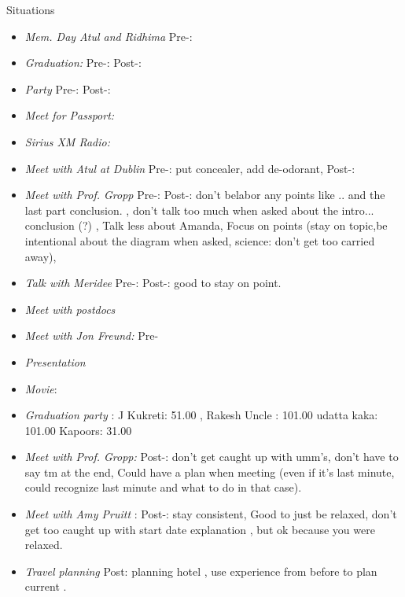 \documentclass[serif, mathserif, final]{beamer}
\begin{document}
\begin{frame}{}
\begin{columns}
\begin{column}{0.20\linewidth}
\begin{block}{Situations}
\begin{itemize}
        \item \tiny \textit{Mem. Day Atul and Ridhima} Pre-: 
        \item \tiny \textit{Graduation:} Pre-:   Post-: 
        \item \tiny \textit{Party } Pre-:  Post-: 
          \item \tiny \textit{Meet for Passport:} 
          \item \tiny \textit{Sirius XM Radio:} 
          \item \tiny \textit{Meet with Atul at Dublin} Pre-: put concealer, add de-odorant, Post-:  

          \item \tiny \textit{Meet with Prof. Gropp} Pre-:  Post-:
            don't belabor any points like .. and the last part
            conclusion. , don't talk too much when asked about the
            intro... conclusion (?) ,
            Talk less about Amanda, Focus on points (stay on
            topic,be intentional about the diagram when asked,
            science: don't get too carried away),
          \item \tiny \textit{Talk with Meridee} Pre-:  Post-:
            good to stay on point.
            
          \item \tiny \textit{Meet with postdocs}
          \item \tiny \textit{Meet with Jon Freund:} Pre- 
          \item \tiny \textit{Presentation} 
            
          \item \tiny \textit{Movie}: 

          \item \tiny \textit{ Graduation party }:  J Kukreti: 51.00 ,
            Rakesh Uncle : 101.00 
            udatta kaka: 101.00
            Kapoors: 31.00

          \item \tiny \textit{Meet with Prof. Gropp: } Post-:
                 don't get caught up with umm's, don't have to say tm
                 at the end, Could have a plan when meeting (even if
                 it's last minute, could recognize last minute and what to
                 do in that case). 

               \item \tiny \textit{Meet with Amy Pruitt} : Post-:
                 stay consistent, Good to just be relaxed, don't get
                 too caught up with start date explanation , but ok
                 because you were relaxed. 

               \item \tiny \textit{Travel planning } Post: planning
                 hotel , use experience from before to plan current .
    \end{itemize}
  \end{block}
\end{column}%
\end{columns}

\end{frame}
\end{document}
